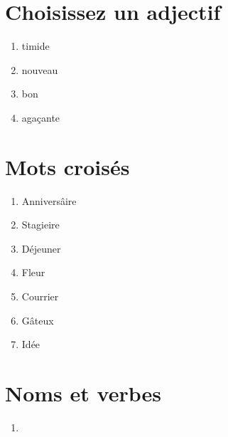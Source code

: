 \section{Choisissez un adjectif}

\begin{enumerate}
    \item timide
    \item nouveau
    \item bon
    \item agaçante
\end{enumerate}

\section{Mots croisés}

\begin{enumerate}
    \item Anniversâire
    \item Stagieire
    \item Déjeuner
    \item Fleur
    \item Courrier
    \item Gâteux
    \item Idée
\end{enumerate}

\section{Noms et verbes}

\begin{enumerate}
    \item 
\end{enumerate}